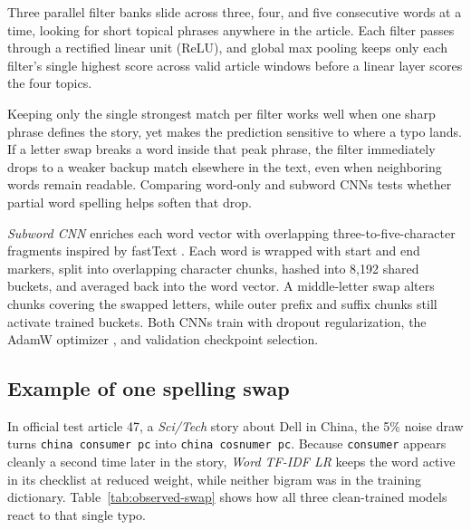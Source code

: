 Three parallel filter banks slide across three, four, and five consecutive words at a time, looking for short topical phrases anywhere in the article. Each filter passes through a rectified linear unit (ReLU), and global max pooling keeps only each filter's single highest score across valid article windows before a linear layer scores the four topics.

Keeping only the single strongest match per filter works well when one sharp phrase defines the story, yet makes the prediction sensitive to where a typo lands. If a letter swap breaks a word inside that peak phrase, the filter immediately drops to a weaker backup match elsewhere in the text, even when neighboring words remain readable. Comparing word-only and subword CNNs tests whether partial word spelling helps soften that drop.

\textit{Subword CNN} enriches each word vector with overlapping three-to-five-character fragments inspired by fastText \citep{bojanowski2017}. Each word is wrapped with start and end markers, split into overlapping character chunks, hashed into 8,192 shared buckets, and averaged back into the word vector. A middle-letter swap alters chunks covering the swapped letters, while outer prefix and suffix chunks still activate trained buckets. Both CNNs train with dropout regularization, the AdamW optimizer \citep{adamw}, and validation checkpoint selection.

\newpage
\subsection{Example of one spelling swap}
In official test article 47, a \emph{Sci/Tech} story about Dell in China, the 5\% noise draw turns \texttt{china consumer pc} into \texttt{china cosnumer pc}. Because \texttt{consumer} appears cleanly a second time later in the story, \textit{Word TF-IDF LR} keeps the word active in its checklist at reduced weight, while neither bigram was in the training dictionary. Table~\ref{tab:observed-swap} shows how all three clean-trained models react to that single typo.

\begin{table}[H]
\centering\normalsize

\caption[Observed swap representations]{How the clean-trained models represent the \texttt{consumer} $\to$ \texttt{cosnumer} swap in official test article 47. Six of \textit{Subword CNN}'s 16 character fragments keep their pre-swap buckets.}
\label{tab:observed-swap}
\end{table}

